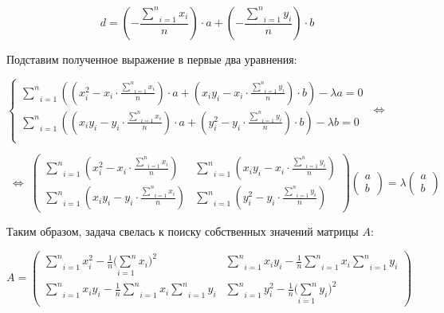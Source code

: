 $$d = \left(-\frac{\underset{i=1}{\overset{n}{\sum}} x_i}{n}\right) \cdot a + \left(-\frac{\underset{i=1}{\overset{n}{\sum}} y_i}{n}\right) \cdot b$$

Подставим полученное выражение в первые два уравнения:

\begin{center}
	$\begin{cases}
		\underset{i=1}{\overset{n}{\sum}}\left((x_i^2-x_i \cdot\frac{\underset{i=1}{\overset{n}{\sum}} x_i}{n})\cdot a + (x_i y_i - x_i \cdot\frac{\underset{i=1}{\overset{n}{\sum}} y_i}{n})\cdot b\right) - \lambda a = 0\\
		\underset{i=1}{\overset{n}{\sum}}\left((x_i y_i - y_i \cdot\frac{\underset{i=1}{\overset{n}{\sum}} x_i}{n})\cdot a + (y_i^2 - y_i \cdot\frac{\underset{i=1}{\overset{n}{\sum}} y_i}{n})\cdot b\right) - \lambda b = 0\\
	\end{cases}\; \Leftrightarrow \; $
\end{center}

\begin{center}
	$\; \Leftrightarrow \; \begin{pmatrix}
		\underset{i=1}{\overset{n}{\sum}}\left(x_i^2-x_i \cdot\frac{\underset{i=1}{\overset{n}{\sum}} x_i}{n}\right)
		& 
		\underset{i=1}{\overset{n}{\sum}}\left(x_i y_i - x_i \cdot\frac{\underset{i=1}{\overset{n}{\sum}} y_i}{n}\right)
		\\
		\underset{i=1}{\overset{n}{\sum}}\left(x_i y_i - y_i \cdot\frac{\underset{i=1}{\overset{n}{\sum}} x_i}{n}\right)
		&
		\underset{i=1}{\overset{n}{\sum}}\left(y_i^2 - y_i \cdot\frac{\underset{i=1}{\overset{n}{\sum}} y_i}{n}\right)
	\end{pmatrix}\begin{pmatrix}
		a \\ b
	\end{pmatrix} = \lambda \begin{pmatrix}
		a \\ b
	\end{pmatrix}$
\end{center}

\newpage
Таким образом, задача свелась к поиску собственных значений матрицы $A$:

\begin{center}
	$A = \begin{pmatrix}
		\underset{i=1}{\overset{n}{\sum}}x_i^2-\frac{1}{n}\underset{i=1}{(\overset{n}{\sum}} x_i)^2
		& 
		\underset{i=1}{\overset{n}{\sum}}x_i y_i - \frac{1}{n}\underset{i=1}{\overset{n}{\sum}}x_i \underset{i=1}{\overset{n}{\sum}} y_i
		\\
		\underset{i=1}{\overset{n}{\sum}}x_i y_i - \frac{1}{n}\underset{i=1}{\overset{n}{\sum}}x_i \underset{i=1}{\overset{n}{\sum}} y_i
		&
		\underset{i=1}{\overset{n}{\sum}}y_i^2-\frac{1}{n}\underset{i=1}{(\overset{n}{\sum}} y_i)^2
	\end{pmatrix}$
\end{center}

